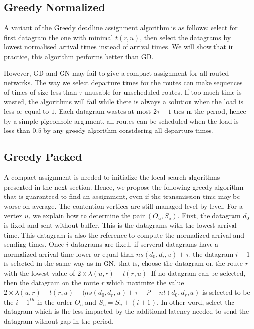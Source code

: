 \documentclass[english]{article}
\begin{document}

\subsection{Greedy Normalized}

A variant of the Greedy deadline assignment algorithm is as follows: select for first datagram the one with minimal $t(r,u)$, then select the datagrams by lowest normalised arrival times instead of arrival times. We will show that in practice, this algorithm performs better than GD.

However, GD and GN may fail to give a compact assignment for all routed networks. The way we select departure times for the routes can make sequences of times of size less than $\tau$ unusable for unscheduled routes. If too much time is wasted, 
the algorithms will fail while there is always a solution when the load is less or equal to $1$. Each datagram wastes at most $2\tau -1$ tics in the period, hence by a simple pigeonhole argument, all routes can be scheduled when the load is less than $0.5$ by any greedy algorithm considering all departure times.



\subsection{Greedy Packed}


A compact assignment is needed to initialize the local search algorithms presented in the next section. Hence, we propose the following greedy algorithm that is guaranteed to find an assignment, even if the transmission time may be worse on average.
The contention vertices are still managed level by level. For a vertex $u$, we explain how to determine the pair $(O_u,S_u)$. First, the datagram $d_0$ is fixed and sent without buffer. This is the datagrams with the lowest arrival time. This datagram is also the reference to compute the normalized arrival and sending times. Once $i$ datagrams are fixed, if serveral datagrams have a normalized arrival time lower or equal than $ns(d_0,d_i,u)+\tau$, the datagram $i+1$ is selected in the same way as in GN, that is, choose the datagram on the route $r$ with the lowest value of $2\times \lambda(u,r) - t(r,u)$. If no datagram can be selected, then the datagram on the route $r$ which maximize the value $2\times \lambda(u,r) - t(r,u) - (ns(d_0,d_r,u)+\tau+P-nt(d_0,d_r,u)$ is selected to be the $i+1^{th}$ in the order $O_u$ and $S_u = S_u + (i+1)$. In other word, select the datagram which is the less impacted by the additional latency needed to send the datagram without gap in the period.
\end{document}
